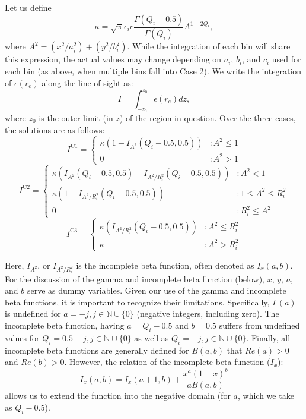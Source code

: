 \documentclass[twocolumn,traditabstract]{aa}
\begin{document}
Let us define
\begin{equation}
  \kappa = \sqrt{\pi}\epsilon_i c \frac{\Gamma(Q_i-0.5)}{\Gamma(Q_i)}A^{1-2Q_i},
\end{equation}
where $A^2 = (x^2 / a_i^2) + (y^2 / b_i^2)$. While the integration of each bin will share this expression,
the actual values may change depending on $a_i$, $b_i$, and $c_i$ used for
each bin (as above, when multiple bins fall into Case 2). We write the  integration of $\epsilon(r_e)$ along the line of sight as:
\begin{equation}
  I = \int_{-z_0}^{z_0} \epsilon(r_e) dz,
  \label{eqn:los_int_setup}
\end{equation}
where $z_0$ is the outer limit (in $z$) of the region in question. Over the three cases, the solutions are as follows:
\begin{equation}
  I^{\text{C1}} = \left\{
  \begin{array}{lr}
    \kappa (1-I_{A^2}(Q_i-0.5,0.5)) &: A^2 \leq 1 \\
    0 &: A^2 > 1
  \end{array}
  \right.
  \label{eqn:case1_int}
\end{equation}
\begin{equation}
  I^{\text{C2}} = \left\{
  \begin{array}{lr}
    \kappa (I_{A^2}(Q_i-0.5,0.5)-I_{A^2/R_i^2}(Q_i-0.5,0.5)) &: A^2 < 1 \\
    \kappa (1-I_{A^2/R_i^2}(Q_i-0.5,0.5)) &: 1 \leq A^2 \leq R_i^2 \\
    0 &: R_i^2 \leq A^2
  \end{array}
  \right.
\end{equation}
\begin{equation}
  I^{\text{C3}} = \left\{
  \begin{array}{lr}
    \kappa (I_{A^2/R_i^2}(Q_i-0.5,0.5)) &: A^2 \leq R_i^2 \\
    \kappa &: A^2 > R_i^2
  \end{array}
  \right.
\end{equation}

Here, $I_{A^2}$, or $I_{A^2/R_i^2}$ is the incomplete beta function, often denoted as $I_x(a,b)$. For the discussion of
the gamma and incomplete beta function (below), $x$, $y$, $a$, and $b$ serve as dummy variables. Given our use of
the gamma and incomplete beta functions, it is important to recognize their limitations.
Specifically, $\Gamma(a)$ is undefined for $a = -j, j \in \mathbb{N} \cup \{0\}$ (negative integers, including
zero). The incomplete beta function, having $a = Q_i -0.5$ and $b = 0.5$ suffers from undefined values
for $Q_i = 0.5-j, j \in \mathbb{N} \cup \{0\}$ as well as $Q_i = -j, j \in \mathbb{N} \cup \{0\}$. Finally, all incomplete
beta functions are generally defined for $B(a,b)$ that $Re(a) > 0$ and $Re(b) > 0$. However, the relation of the
incomplete beta function ($I_x$):
\begin{equation}
  I_x(a,b) = I_x(a+1,b) + \frac{x^a (1-x)^b}{a B(a,b)}
  \label{eqn:recibeta}
\end{equation}
allows us to extend the function into the negative domain (for $a$, which we take as $Q_i-0.5$). 
\end{document}
